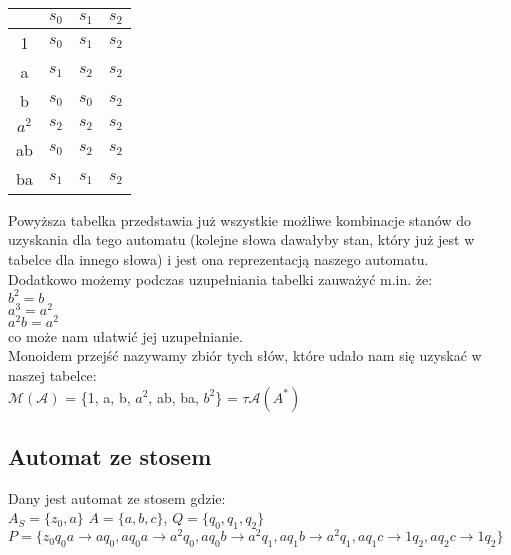 \documentclass[main.tex]{subfiles}
\begin{document}
    \begin{table}[H]
        \centering
        \begin{tabular}{|c|l|l|l|}
            \hline
            & $s_{0}$ & $s_{1}$ & $s_{2}$ \\ \hline
            1 & $s_{0}$ & $s_{1}$ & $s_{2}$ \\ \hline
            a & $s_{1}$ & $s_{2}$ & $s_{2}$ \\ \hline
            b & $s_{0}$ & $s_{0}$ & $s_{2}$ \\ \hline
            $a^2$  & $s_{2}$ & $s_{2}$ & $s_{2}$ \\ \hline
            ab & $s_{0}$ & $s_{2}$ & $s_{2}$ \\ \hline
            ba & $s_{1}$ & $s_{1}$ & $s_{2}$ \\ \hline
        \end{tabular}
    \end{table}

    \noindent Powyższa tabelka przedstawia już wszystkie możliwe kombinacje stanów do uzyskania dla tego automatu (kolejne słowa dawałyby stan, który już jest w tabelce dla innego słowa) i jest ona reprezentacją naszego automatu. \\

    \noindent Dodatkowo możemy podczas uzupełniania tabelki zauważyć m.in. że: \\
    $b^2 = b$ \\
    $a^3 = a^2$ \\
    $a^{2}b = a^2$ \\
    co może nam ułatwić jej uzupełnianie. \\

    \noindent Monoidem przejść nazywamy zbiór tych słów, które udało nam się uzyskać w naszej tabelce: \\
    $\mathcal{M(A)}$ = \{1, a, b, $a^2$, ab, ba, $b^2$\} = $\tau \mathcal{A}(A^{*})$

    \subsection{Automat ze stosem}
    Dany jest automat ze stosem gdzie: \\
    $A_{S} = \{z_{0}, a\}$ $A = \{a, b, c\}$, $Q = \{q_{0}, q_{1}, q_{2}\}$ \\
    $P = \{z_{0}q_{0}a \rightarrow aq_{0}, aq_{0}a \rightarrow a^2 q_{0}, aq_{0}b \rightarrow a^2 q_{1}, aq_{1}b \rightarrow a^2 q_{1}, aq_{1}c \rightarrow 1q_{2}, aq_{2}c \rightarrow 1q_{2}\}$ \\
\end{document}
